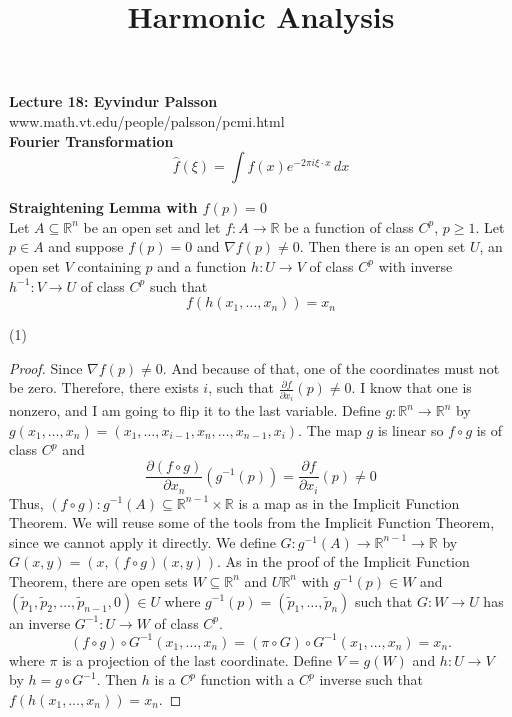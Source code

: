 \documentclass[12pt]{article}
\title{Harmonic Analysis}
\begin{document}
\noindent \textbf{Lecture 18: Eyvindur Palsson} \\
\noindent www.math.vt.edu/people/palsson/pcmi.html \\

\noindent \textbf{Fourier Transformation} \\
$$\hat{f}(\xi) = \int f(x) e^{-2\pi i \xi \cdot x} \, dx$$

\noindent \textbf{Straightening Lemma with $f(p)=0$} \\
\noindent Let $A \subseteq \mathbb{R}^n$ be an open set and let $f:A\rightarrow \mathbb{R}$ be a function of class $C^p$, $p \geq 1$. Let $p \in A$ and suppose $f(p)=0$ and $\nabla f(p) \not =0$. Then there is an open set $U$, an open set $V$ containing $p$ and a function $h: U \rightarrow V$ of class $C^p$ with inverse $h^{-1}: V \rightarrow U$ of class $C^p$ such that
$$ f(h(x_1, \dots, x_n)) = x_n$$

(1)

\begin{proof}
Since $\nabla f(p) \not = 0$. And because of that, one of the coordinates must not be zero. Therefore, there exists $i$, such that $\frac{\partial f}{\partial x_i}(p) \not =0$. I know that one is nonzero, and I am going to flip it to the last variable. Define $g: \mathbb{R}^n \rightarrow \mathbb{R}^n$ by $g(x_1, \dots, x_n) = (x_1, \dots, x_{i-1}, x_n, \dots, x_{n-1}, x_i)$.  The map $g$ is linear so $f \circ g$ is of class $C^p$ and 
$$\frac{\partial(f \circ g)}{\partial x_n}(g^{-1}(p)) = \frac{\partial f}{\partial x_i}(p) \not = 0$$
Thus, $(f \circ g) : g^{-1}(A) \subseteq \mathbb{R}^{n-1} \times \mathbb{R}$ is a map as in the Implicit Function Theorem. We will reuse some of the tools from the Implicit Function Theorem, since we cannot apply it directly. We define $G: g^{-1}(A) \rightarrow \mathbb{R}^{n-1} \rightarrow \mathbb{R}$ by $G(x,y)= (x,(f\circ g)(x,y))$. As in the proof of the Implicit Function Theorem, there are open sets $W \subseteq \mathbb{R}^n$ and $U \mathbb{R}^n$ with $g^{-1}(p) \in W$ and $(\tilde{p}_1, \tilde{p}_2, \dots, \tilde{p}_{n-1}, 0) \in U$ where $g^{-1}(p) = (\tilde{p}_1, \dots, \tilde{p}_{n})$ such that $G: W \rightarrow U$ has an inverse $G^{-1}:U \rightarrow W$ of class $C^p$. 
$$(f \circ g) \circ G^{-1}(x_1, \dots, x_n) = (\pi \circ G) \circ G^{-1}(x_1, \dots, x_n) = x_n.$$
where $\pi$ is a projection of the last coordinate. Define $V = g(W)$ and $h: U \rightarrow V$ by $h = g \circ G^{-1}$. Then $h$ is a $C^p$ function with a $C^p$ inverse such that $f(h(x_1, \dots, x_n)) = x_n$. 
\end{proof}
\end{document}
